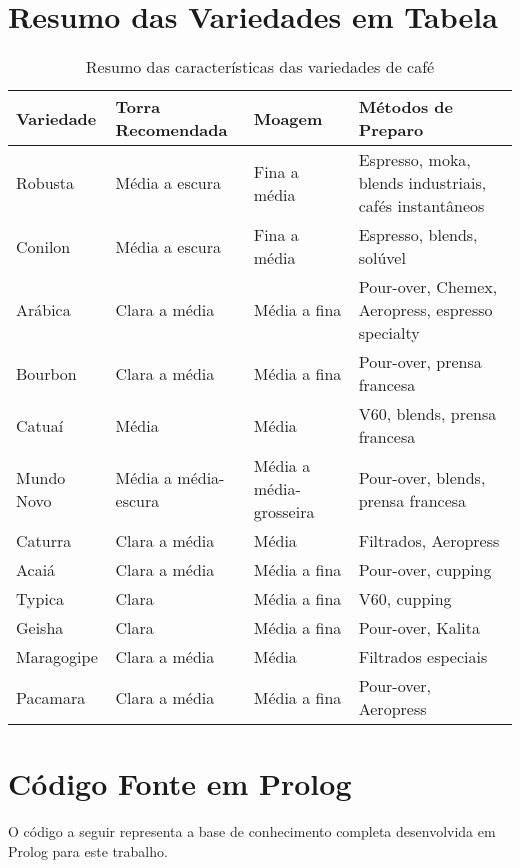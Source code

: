 \documentclass[a4paper,12pt]{article}
\begin{document}
\section{Resumo das Variedades em Tabela}

\begin{table}[h!]
\centering
\caption{Resumo das características das variedades de café}
\begin{tabular}{|>{\raggedright\arraybackslash}p{3.5cm}|>{\raggedright\arraybackslash}p{2.5cm}|>{\raggedright\arraybackslash}p{2.5cm}|>{\raggedright\arraybackslash}p{4cm}|}
\hline
\textbf{Variedade} & \textbf{Torra Recomendada} & \textbf{Moagem} & \textbf{Métodos de Preparo} \\
\hline
Robusta & Média a escura & Fina a média & Espresso, moka, blends industriais, cafés instantâneos \\
\hline
Conilon & Média a escura & Fina a média & Espresso, blends, solúvel \\
\hline
Arábica & Clara a média & Média a fina & Pour-over, Chemex, Aeropress, espresso specialty \\
\hline
Bourbon & Clara a média & Média a fina & Pour-over, prensa francesa \\
\hline
Catuaí & Média & Média & V60, blends, prensa francesa \\
\hline
Mundo Novo & Média a média-escura & Média a média-grosseira & Pour-over, blends, prensa francesa \\
\hline
Caturra & Clara a média & Média & Filtrados, Aeropress \\
\hline
Acaiá & Clara a média & Média a fina & Pour-over, cupping \\
\hline
Typica & Clara & Média a fina & V60, cupping \\
\hline
Geisha & Clara & Média a fina & Pour-over, Kalita \\
\hline
Maragogipe & Clara a média & Média & Filtrados especiais \\
\hline
Pacamara & Clara a média & Média a fina & Pour-over, Aeropress \\
\hline
\end{tabular}
\end{table}


\FloatBarrier
\appendix
\section{Código Fonte em Prolog}
\label{sec:codigo_prolog}
O código a seguir representa a base de conhecimento completa desenvolvida em Prolog para este trabalho.





\nocite{counterculture_pourover}
\nocite{embrapa_catalog}
\nocite{perfectdailygrind_geisha}
\nocite{sca_brewing_chart}
\nocite{sca_standard_pdf}
\nocite{wcr_varieties}
\nocite{wikipedia_geisha}
\end{document}
